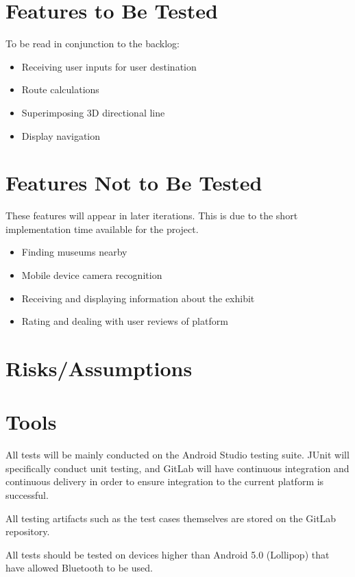 \documentclass[12pt]{article}
\begin{document}
\section{Features to Be Tested}
To be read in conjunction to the backlog:
\begin{itemize}
    \item Receiving user inputs for user destination
    \item Route calculations
    \item Superimposing 3D directional line
    \item Display navigation
\end{itemize}

\section{Features Not to Be Tested}
These features will appear in later iterations. This is due to the short implementation time available for the project.
\begin{itemize}
    \item Finding museums nearby
    \item Mobile device camera recognition
    \item Receiving and displaying information about the exhibit
    \item Rating and dealing with user reviews of platform
\end{itemize}

\section{Risks/Assumptions}

\section{Tools}
All tests will be mainly conducted on the Android Studio testing suite. JUnit will specifically conduct unit testing, and GitLab will have continuous integration and continuous delivery in order to ensure integration to the current platform is successful.

All testing artifacts such as the test cases themselves are stored on the GitLab repository.

All tests should be tested on devices higher than Android 5.0 (Lollipop) that have allowed Bluetooth to be used.
\end{document}
